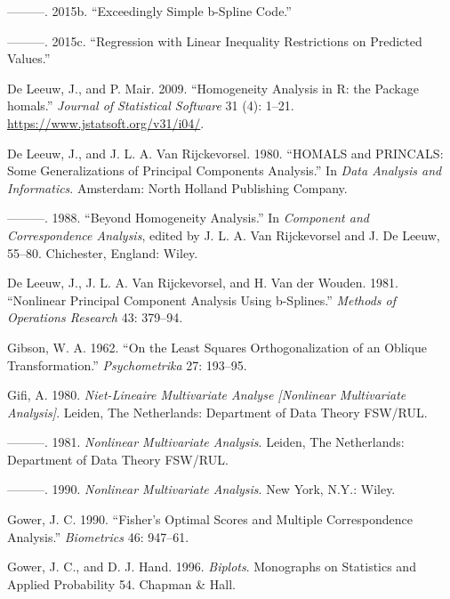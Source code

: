 \documentclass[
  12pt,
  letterpaper,
]{scrbook}
\newlength{\cslhangindent}
\newenvironment{CSLReferences}[2] %
 {\begin{list}{}{%
  \setlength{\itemindent}{0pt}
  \setlength{\leftmargin}{0pt}
  \setlength{\parsep}{0pt}
  \ifodd #1
   \setlength{\leftmargin}{\cslhangindent}
   \setlength{\itemindent}{-1\cslhangindent}
  \fi
  \setlength{\itemsep}{#2\baselineskip}}}
 {\end{list}}
\begin{document}
\begin{CSLReferences}{1}{0}
---------. 2015b. {``Exceedingly Simple b-Spline Code.''}

---------. 2015c. {``Regression with Linear Inequality Restrictions on
Predicted Values.''}

De Leeuw, J., and P. Mair. 2009. {``{Homogeneity Analysis in {R}: the
Package homals}.''} \emph{Journal of Statistical Software} 31 (4):
1--21. \url{https://www.jstatsoft.org/v31/i04/}.

De Leeuw, J., and J. L. A. Van Rijckevorsel. 1980. {``{HOMALS} and
{PRINCALS}: Some Generalizations of Principal Components Analysis.''} In
\emph{Data Analysis and Informatics}. Amsterdam: North Holland
Publishing Company.

---------. 1988. {``Beyond Homogeneity Analysis.''} In \emph{Component
and Correspondence Analysis}, edited by J. L. A. Van Rijckevorsel and J.
De Leeuw, 55--80. Chichester, England: Wiley.

De Leeuw, J., J. L. A. Van Rijckevorsel, and H. Van der Wouden. 1981.
{``Nonlinear Principal Component Analysis Using b-Splines.''}
\emph{Methods of Operations Research} 43: 379--94.

Gibson, W. A. 1962. {``{On the Least Squares Orthogonalization of an
Oblique Transformation}.''} \emph{Psychometrika} 27: 193--95.

Gifi, A. 1980. \emph{Niet-Lineaire Multivariate Analyse {[}Nonlinear
Multivariate Analysis{]}}. Leiden, The Netherlands: Department of Data
Theory FSW/RUL.

---------. 1981. \emph{Nonlinear Multivariate Analysis}. Leiden, The
Netherlands: Department of Data Theory FSW/RUL.

---------. 1990. \emph{Nonlinear Multivariate Analysis}. New York, N.Y.:
Wiley.

Gower, J. C. 1990. {``{Fisher's Optimal Scores and Multiple
Correspondence Analysis}.''} \emph{Biometrics} 46: 947--61.

Gower, J. C., and D. J. Hand. 1996. \emph{{Biplots}}. Monographs on
Statistics and Applied Probability 54. {Chapman \& Hall}.


\end{CSLReferences}
\end{document}
